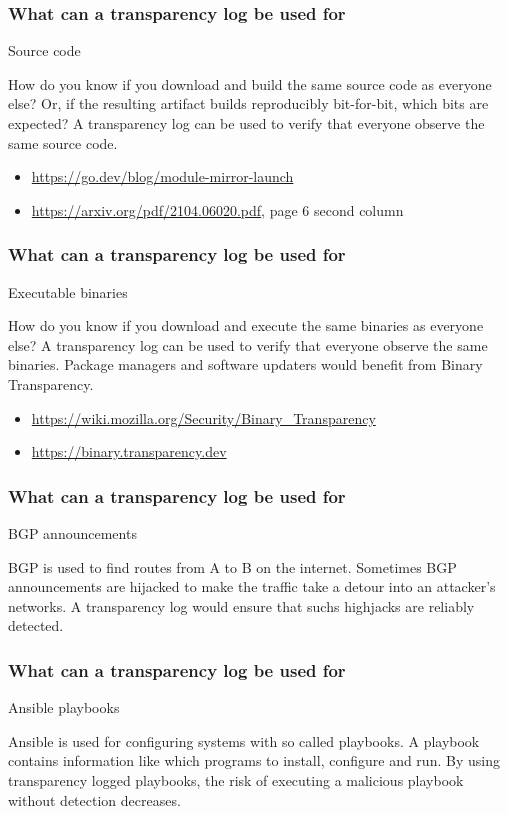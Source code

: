 \begin{frame}
  \frametitle{What can a transparency log be used for}

  Source code
  \pause

  How do you know if you download and build the same source code as
  everyone else?  Or, if the resulting artifact builds reproducibly
  bit-for-bit, which bits are expected?  A transparency log can be
  used to verify that everyone observe the same source code.

  \begin{itemize}
  \item \url{https://go.dev/blog/module-mirror-launch}
  \item \url{https://arxiv.org/pdf/2104.06020.pdf}, page 6 second
    column
  \end{itemize}

\end{frame}

\begin{frame}
  \frametitle{What can a transparency log be used for}

  Executable binaries
  \pause

  How do you know if you download and execute the same binaries as
  everyone else?  A transparency log can be used to verify that
  everyone observe the same binaries. Package managers and software
  updaters would benefit from Binary Transparency.

  \begin{itemize}
  \item \url{https://wiki.mozilla.org/Security/Binary_Transparency}
  \item \url{https://binary.transparency.dev}
  \end{itemize}
\end{frame}


\begin{frame}
  \frametitle{What can a transparency log be used for}

  BGP announcements
  \pause

  BGP is used to find routes from A to B on the internet. Sometimes
  BGP announcements are hijacked to make the traffic take a detour
  into an attacker's networks. A transparency log would ensure that
  suchs highjacks are reliably detected.
\end{frame}


\begin{frame}
  \frametitle{What can a transparency log be used for}

  Ansible playbooks
  \pause

  Ansible is used for configuring systems with so called playbooks. A
  playbook contains information like which programs to install,
  configure and run. By using transparency logged playbooks, the risk
  of executing a malicious playbook without detection decreases.
\end{frame}

